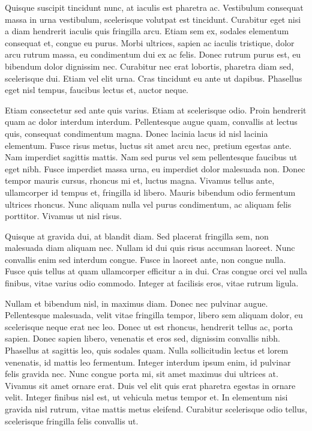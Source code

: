 Quisque suscipit tincidunt nunc, at iaculis est pharetra ac. Vestibulum
consequat massa in urna vestibulum, scelerisque volutpat est tincidunt.
Curabitur eget nisi a diam hendrerit iaculis quis fringilla arcu. Etiam sem ex,
sodales elementum consequat et, congue eu purus. Morbi ultrices, sapien ac
iaculis tristique, dolor arcu rutrum massa, eu condimentum dui ex ac felis.
Donec rutrum purus est, eu bibendum dolor dignissim nec. Curabitur nec erat
lobortis, pharetra diam sed, scelerisque dui. Etiam vel elit urna. Cras
tincidunt eu ante ut dapibus. Phasellus eget nisl tempus, faucibus lectus et,
auctor neque.

Etiam consectetur sed ante quis varius. Etiam at scelerisque odio. Proin
hendrerit quam ac dolor interdum interdum. Pellentesque augue quam, convallis
at lectus quis, consequat condimentum magna. Donec lacinia lacus id nisl
lacinia elementum. Fusce risus metus, luctus sit amet arcu nec, pretium egestas
ante. Nam imperdiet sagittis mattis. Nam sed purus vel sem pellentesque
faucibus ut eget nibh. Fusce imperdiet massa urna, eu imperdiet dolor malesuada
non. Donec tempor mauris cursus, rhoncus mi et, luctus magna. Vivamus tellus
ante, ullamcorper id tempus et, fringilla id libero. Mauris bibendum odio
fermentum ultrices rhoncus. Nunc aliquam nulla vel purus condimentum, ac
aliquam felis porttitor. Vivamus ut nisl risus.

Quisque at gravida dui, at blandit diam. Sed placerat fringilla sem, non
malesuada diam aliquam nec. Nullam id dui quis risus accumsan laoreet. Nunc
convallis enim sed interdum congue. Fusce in laoreet ante, non congue nulla.
Fusce quis tellus at quam ullamcorper efficitur a in dui. Cras congue orci vel
nulla finibus, vitae varius odio commodo. Integer at facilisis eros, vitae
rutrum ligula.

Nullam et bibendum nisl, in maximus diam. Donec nec pulvinar augue.
Pellentesque malesuada, velit vitae fringilla tempor, libero sem aliquam dolor,
eu scelerisque neque erat nec leo. Donec ut est rhoncus, hendrerit tellus ac,
porta sapien. Donec sapien libero, venenatis et eros sed, dignissim convallis
nibh. Phasellus at sagittis leo, quis sodales quam. Nulla sollicitudin lectus
et lorem venenatis, id mattis leo fermentum. Integer interdum ipsum enim, id
pulvinar felis gravida nec. Nunc congue porta mi, sit amet maximus dui ultrices
at. Vivamus sit amet ornare erat. Duis vel elit quis erat pharetra egestas in
ornare velit. Integer finibus nisl est, ut vehicula metus tempor et. In
elementum nisi gravida nisl rutrum, vitae mattis metus eleifend. Curabitur
scelerisque odio tellus, scelerisque fringilla felis convallis ut.

